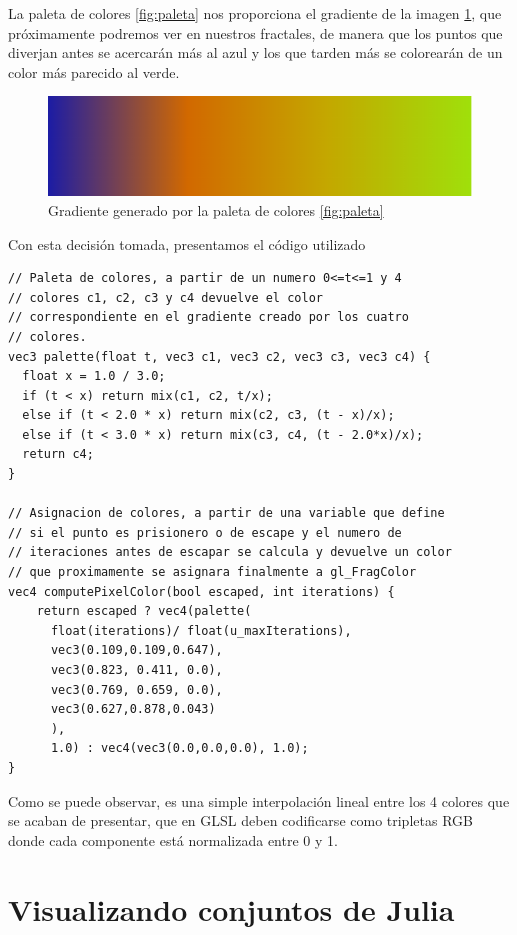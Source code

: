 La paleta de colores \ref{fig:paleta} nos proporciona el gradiente de la imagen \ref{fig:gradiente}, que próximamente podremos ver en nuestros fractales, de manera que los puntos que diverjan antes se acercarán más al azul y los que tarden más se colorearán de un color más parecido al verde.

\begin{figure} [ht]
    \centering
    \includegraphics[scale = 0.51]{img/C6/gradiente.png}
    \caption{Gradiente generado por la paleta de colores \ref{fig:paleta}}
    \label{fig:gradiente}
\end{figure}

Con esta decisión tomada, presentamos el código utilizado

\begin{lstlisting}
// Paleta de colores, a partir de un numero 0<=t<=1 y 4 
// colores c1, c2, c3 y c4 devuelve el color 
// correspondiente en el gradiente creado por los cuatro 
// colores.
vec3 palette(float t, vec3 c1, vec3 c2, vec3 c3, vec3 c4) {
  float x = 1.0 / 3.0;
  if (t < x) return mix(c1, c2, t/x);
  else if (t < 2.0 * x) return mix(c2, c3, (t - x)/x);
  else if (t < 3.0 * x) return mix(c3, c4, (t - 2.0*x)/x);
  return c4;
}

// Asignacion de colores, a partir de una variable que define
// si el punto es prisionero o de escape y el numero de 
// iteraciones antes de escapar se calcula y devuelve un color 
// que proximamente se asignara finalmente a gl_FragColor
vec4 computePixelColor(bool escaped, int iterations) {
    return escaped ? vec4(palette(
      float(iterations)/ float(u_maxIterations),
      vec3(0.109,0.109,0.647), 
      vec3(0.823, 0.411, 0.0), 
      vec3(0.769, 0.659, 0.0), 
      vec3(0.627,0.878,0.043)
      ), 
      1.0) : vec4(vec3(0.0,0.0,0.0), 1.0);
}
\end{lstlisting}

Como se puede observar, es una simple interpolación lineal entre los 4 colores que se acaban de presentar, que en GLSL deben codificarse como tripletas RGB donde cada componente está normalizada entre 0 y 1.

\section{Visualizando conjuntos de Julia}
\label{section:grafica-julia}

